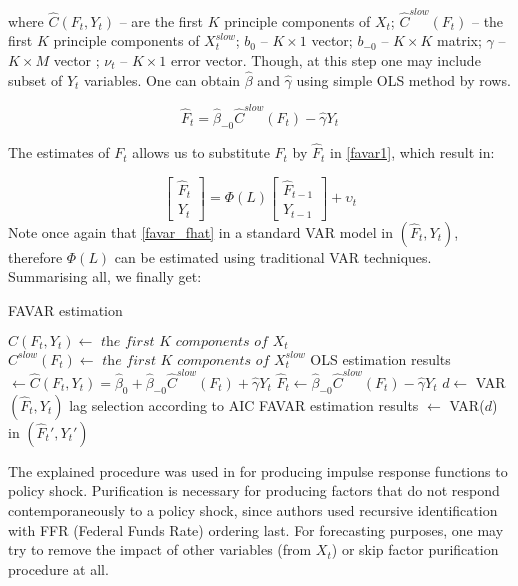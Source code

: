 \documentclass[a4paper, 14pt]{article}
\begin{document}
 \noindent where $\hat{C}(F_t, Y_t)$ -- are the first $K$ principle components of $X_t$; $\hat{C}^{slow}(F_t)$ -- the first $K$ principle components of $X_t^{slow}$; $b_0$ -- $K \times 1$ vector; $b_{-0}$ -- $K \times K$ matrix; $\gamma$ -- $K \times M$ vector ; $\nu_t$ -- $K \times 1$ error vector. Though, at this step one may include subset of $Y_t$ variables. One can obtain $\hat{\beta}$ and $\hat{\gamma}$ using simple OLS method by rows.
  
 \[\hat{F}_t = \hat{\beta}_{-0} \hat{C}^{slow}(F_t) - \hat{\gamma}Y_t      \]  
 
 \noindent The estimates of $F_t$ allows us to substitute $F_t$ by $\hat{F}_t$ in \eqref{favar1},  which result in:
 
 \begin{equation}\label{favar_fhat}
 	\begin{bmatrix}
 	\hat{F}_t \\
 	Y_t
 	\end{bmatrix} = \Phi (L) 
 	\begin{bmatrix}
 	\hat{F}_{t-1} \\
 	Y_{t-1}
 	\end{bmatrix} + \upsilon_t
 \end{equation}
 Note once again that \eqref{favar_fhat} in a standard VAR model in $(\hat{F}_t, Y_t)$, therefore $\Phi(L)$ can be estimated using traditional VAR techniques. Summarising all, we finally get:

\begin{algorithm}
	\caption{FAVAR estimation}
	$C(F_t,Y_t) \gets \textit{ the first K components of } X_t $ \newline
	$C^{slow}(F_t) \gets \textit{ the first K components of } X_t^{slow}$ \newline
	OLS estimation results $\gets \hat{C}(F_t, Y_t) = \hat{\beta}_0 + \hat{\beta}_{-0} \hat{C}^{slow}(F_t) + \hat{\gamma} Y_t$\newline
	$\hat{F}_t \gets \hat{\beta}_{-0} \hat{C}^{slow}(F_t) - \hat{\gamma}Y_t$\newline
	$d \gets$ VAR$(\hat{F}_t, Y_t)$ lag selection according to AIC\newline
	FAVAR estimation results $\gets$ VAR($d$) in $(\hat{F}_t', Y_t')$
\end{algorithm}

The explained procedure was used in \cite{bernanke2005measuring} for producing impulse response functions to policy shock. Purification is necessary for producing factors that do not respond contemporaneously to a policy shock, since authors used recursive identification with FFR (Federal Funds Rate) ordering last. For forecasting purposes, one may try to remove the impact of other variables (from $X_t$) or skip factor purification procedure at all. 
\end{document}
